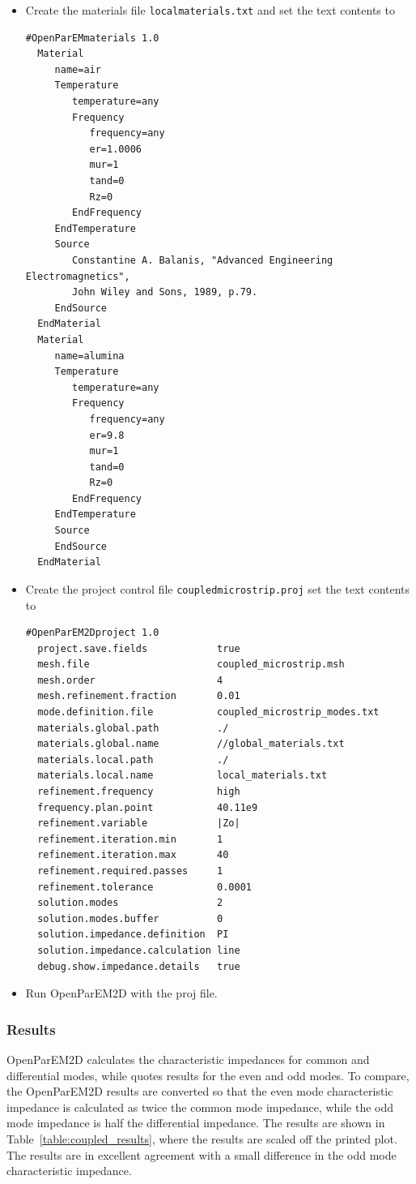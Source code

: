 \documentclass[titlepage]{article}
\renewcommand\_{\textunderscore\linebreak[1]}
\begin{document}
\begin{itemize}
\item Create the materials file \texttt{local\_materials.txt} and set the text contents to
\begin{Verbatim}[fontsize=\small]
  #OpenParEMmaterials 1.0
  Material
     name=air
     Temperature
        temperature=any
        Frequency
           frequency=any
           er=1.0006
           mur=1
           tand=0
           Rz=0
        EndFrequency
     EndTemperature
     Source
        Constantine A. Balanis, "Advanced Engineering Electromagnetics",
        John Wiley and Sons, 1989, p.79.
     EndSource
  EndMaterial
  Material
     name=alumina
     Temperature
        temperature=any
        Frequency
           frequency=any
           er=9.8
           mur=1
           tand=0
           Rz=0
        EndFrequency
     EndTemperature
     Source
     EndSource
  EndMaterial
\end{Verbatim}
\item Create the project control file \texttt{coupled\_microstrip.proj} set the text contents to
\begin{Verbatim}[fontsize=\small]
  #OpenParEM2Dproject 1.0
  project.save.fields            true
  mesh.file                      coupled_microstrip.msh
  mesh.order                     4
  mesh.refinement.fraction       0.01
  mode.definition.file           coupled_microstrip_modes.txt
  materials.global.path          ./
  materials.global.name          //global_materials.txt
  materials.local.path           ./
  materials.local.name           local_materials.txt
  refinement.frequency           high
  frequency.plan.point           40.11e9
  refinement.variable            |Zo|
  refinement.iteration.min       1
  refinement.iteration.max       40
  refinement.required.passes     1
  refinement.tolerance           0.0001
  solution.modes                 2
  solution.modes.buffer          0
  solution.impedance.definition  PI
  solution.impedance.calculation line
  debug.show.impedance.details   true
\end{Verbatim}
\item Run OpenParEM2D with the proj file.
\end{itemize}

\subsubsection{Results}

OpenParEM2D calculates the characteristic impedances for common and differential modes, while \cite{Olyslager} quotes results for the even and odd modes.  To compare, the OpenParEM2D results are converted so that the even mode characteristic impedance is calculated as twice the common mode impedance, while the odd mode impedance is half the differential impedance.  The results are shown in Table~\ref{table:coupled_results}, where the \cite{Olyslager} results are scaled off the printed plot.  The results are in excellent agreement with a small difference in the odd mode characteristic impedance.
\end{document}

